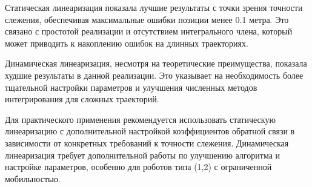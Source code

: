 Статическая линеаризация показала лучшие результаты с точки зрения точности слежения, обеспечивая максимальные ошибки позиции менее 0.1 метра. Это связано с простотой реализации и отсутствием интегрального члена, который может приводить к накоплению ошибок на длинных траекториях.

Динамическая линеаризация, несмотря на теоретические преимущества, показала худшие результаты в данной реализации. Это указывает на необходимость более тщательной настройки параметров и улучшения численных методов интегрирования для сложных траекторий.

Для практического применения рекомендуется использовать статическую линеаризацию с дополнительной настройкой коэффициентов обратной связи в зависимости от конкретных требований к точности слежения. Динамическая линеаризация требует дополнительной работы по улучшению алгоритма и настройке параметров, особенно для роботов типа (1,2) с ограниченной мобильностью.

